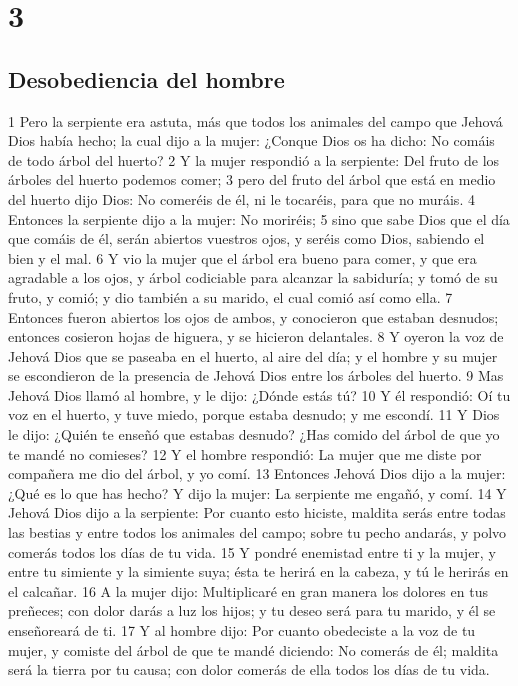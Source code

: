 \chapter{3}

\section{Desobediencia del hombre}

1 Pero la serpiente era astuta, más que todos los animales del campo que Jehová Dios había hecho; la cual dijo a la mujer: ¿Conque Dios os ha dicho: No comáis de todo árbol del huerto?
2 Y la mujer respondió a la serpiente: Del fruto de los árboles del huerto podemos comer;
3 pero del fruto del árbol que está en medio del huerto dijo Dios: No comeréis de él, ni le tocaréis, para que no muráis.
4 Entonces la serpiente dijo a la mujer: No moriréis;
5 sino que sabe Dios que el día que comáis de él, serán abiertos vuestros ojos, y seréis como Dios, sabiendo el bien y el mal.
6 Y vio la mujer que el árbol era bueno para comer, y que era agradable a los ojos, y árbol codiciable para alcanzar la sabiduría; y tomó de su fruto, y comió; y dio también a su marido, el cual comió así como ella.
7 Entonces fueron abiertos los ojos de ambos, y conocieron que estaban desnudos; entonces cosieron hojas de higuera, y se hicieron delantales.
8 Y oyeron la voz de Jehová Dios que se paseaba en el huerto, al aire del día; y el hombre y su mujer se escondieron de la presencia de Jehová Dios entre los árboles del huerto.
9 Mas Jehová Dios llamó al hombre, y le dijo: ¿Dónde estás tú?
10 Y él respondió: Oí tu voz en el huerto, y tuve miedo, porque estaba desnudo; y me escondí.
11 Y Dios le dijo: ¿Quién te enseñó que estabas desnudo? ¿Has comido del árbol de que yo te mandé no comieses?
12 Y el hombre respondió: La mujer que me diste por compañera me dio del árbol, y yo comí.
13 Entonces Jehová Dios dijo a la mujer: ¿Qué es lo que has hecho? Y dijo la mujer: La serpiente me engañó, y comí.
14 Y Jehová Dios dijo a la serpiente: Por cuanto esto hiciste, maldita serás entre todas las bestias y entre todos los animales del campo; sobre tu pecho andarás, y polvo comerás todos los días de tu vida.
15 Y pondré enemistad entre ti y la mujer, y entre tu simiente y la simiente suya; ésta te herirá en la cabeza, y tú le herirás en el calcañar.
16 A la mujer dijo: Multiplicaré en gran manera los dolores en tus preñeces; con dolor darás a luz los hijos; y tu deseo será para tu marido, y él se enseñoreará de ti.
17 Y al hombre dijo: Por cuanto obedeciste a la voz de tu mujer, y comiste del árbol de que te mandé diciendo: No comerás de él; maldita será la tierra por tu causa; con dolor comerás de ella todos los días de tu vida.
